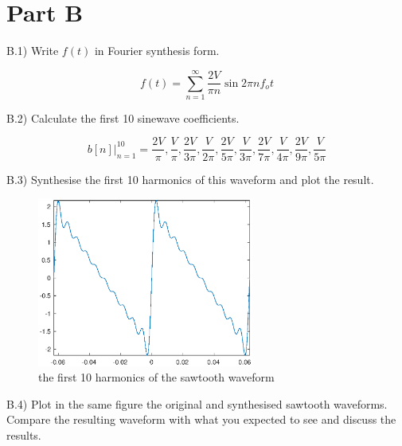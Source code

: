 \section*{Part B}

\begin{tcolorbox}
  B.1) Write $f(t)$ in Fourier synthesis form.
\end{tcolorbox}

\[ f(t)= \sum_{n=1}^{\infty} \frac{2V}{\pi n}\sin2\pi n f_o t \]

\begin{tcolorbox}
  B.2) Calculate the first 10 sinewave coefficients.
\end{tcolorbox}



\[ b[n]\Big\rvert_{n=1}^{10} = {\frac{2V}{\pi}, \frac{V}{\pi}, \frac{2V}{3\pi}, \frac{V}{2\pi}, \frac{2V}{5\pi}, \frac{V}{3\pi}, \frac{2V}{7\pi}, \frac{V}{4\pi}, \frac{2V}{9\pi}, \frac{V}{5\pi}} \]

\begin{tcolorbox}
  B.3) Synthesise the first 10 harmonics of this waveform and plot the result.
\end{tcolorbox}



\begin{figure}[htbp]
  \centering
  \includegraphics[width=2.8in]{matlab/fig/B_r_3.eps}
  \caption{the first 10 harmonics of the sawtooth waveform}    
  \label{fig:B_r_3}
\end{figure}

\pagebreak

\begin{tcolorbox}
  B.4) Plot in the same figure the original and synthesised sawtooth waveforms. Compare the resulting waveform with what you expected to see and discuss the results.
\end{tcolorbox}

